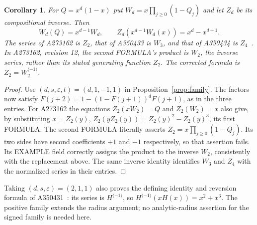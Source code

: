\documentclass[11pt]{article}
\newtheorem{corollary}[theorem]{Corollary}
\begin{document}
\begin{corollary}\label{cor:signed}
For $Q=x^d(1-x)$ put $W_d=x\prod_{j\ge0}(1-Q_j)$ and let $Z_d$
be its compositional inverse. Then
\[
 W_d(Q)=x^{d-1}W_d,\qquad Z_d(x^{d-1}W_d(x))=x^d-x^{d+1}.
\]
The series of A273162 is $Z_2$, that of A350433 is $W_3$, and
that of A350434 is $Z_4$~\cite{hanna-signed}.
In A273162, revision 12, the second FORMULA's product is $W_2$,
the inverse series, rather than its stated generating function $Z_2$.
The corrected formula is $Z_2=W_2^{\langle-1\rangle}$.
\end{corollary}
\begin{proof}
Use $(d,s,\varepsilon,t)=(d,1,-1,1)$ in
Proposition~\ref{prop:family}. The factors now satisfy
$F(j+2)=1-(1-F(j+1))^dF(j+1)$, as in the three entries.
For A273162 the equations $Z_2(xW_2)=Q$ and $Z_2(W_2)=x$
also give, by substituting $x=Z_2(y)$,
$Z_2(yZ_2(y))=Z_2(y)^2-Z_2(y)^3$, its first FORMULA.
The second FORMULA literally asserts $Z_2=x\prod_{j\ge0}(1-Q_j)$.
Its two sides have second coefficients $+1$ and $-1$ respectively,
so that assertion fails. Its EXAMPLE field correctly assigns the product
to the inverse $W_2$, consistently with the replacement above.
The same inverse identity identifies $W_3$ and $Z_4$ with the
normalized series in their entries.
\end{proof}

Taking $(d,s,\varepsilon)=(2,1,1)$ also proves the defining
identity and reversion formula of A350431~\cite{hanna431}: its
series is $H^{\langle-1\rangle}$, so
$H^{\langle-1\rangle}(xH(x))=x^2+x^3$.
The positive family extends the radius argument; no analytic-radius
assertion for the signed family is needed here.
\end{document}
